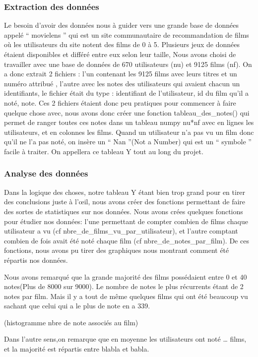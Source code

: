 \documentclass[a4paper,10pt]{article}
\begin{document}
\subsubsection{Extraction des données}
Le besoin d'avoir des données nous à guider vers une grande base de données appelé `` movielens '' qui est un site communautaire de recommandation de films où les utilisateurs du site notent des films de 0 à 5.  
Plusieurs jeux de données étaient disponibles et différé entre eux selon leur taille,  
Nous avons choisi de travailler avec une base de données de 670 utilisateurs (nu) et 9125 films (nf).  
On a donc extrait 2 fichiers : l’un contenant les 9125 films avec leurs titres et un numéro attribué ,  
l’autre avec les notes des utilisateurs qui avaient chacun un identifiants,  
le fichier était du type : identifiant de l’utilisateur, id du film qu’il a noté, note. 
Ces 2 fichiers étaient donc peu pratiques pour commencer à faire quelque chose avec,  
nous avons donc créer une fonction tableau\_des\_notes() qui permet de ranger toutes ces notes dans un tableau numpy nu*nf avec en lignes les utilisateurs,  
et en colonnes les films. Quand un utilisateur n’a pas vu un film donc qu’il ne l’a pas noté,  
on insère un `` Nan ''(Not a Number) qui est un `` symbole '' facile à traiter. On appellera ce tableau Y tout au long du projet. 
\subsubsection{Analyse des données}
Dans la logique des choses, notre tableau Y étant bien trop grand pour en tirer des conclusions 
juste à l’œil, nous avons créer des fonctions permettant de faire des sortes de statistiques sur nos données.
Nous avons crées quelques fonctions pour étudier nos données: l’une permettant de compter combien de films
chaque utilisateur a vu (cf nbre\_de\_films\_vu\_par\_utilisateur), et l’autre comptant combien de fois avait été noté chaque film 
(cf nbre\_de\_notes\_par\_film). De ces fonctions, nous avons pu tirer des graphiques nous montrant comment été répartis nos données.


Nous avons remarqué que la grande majorité des films possédaient entre 0 et 40 notes(Plus de 8000 sur 9000). 
Le nombre de notes le plus récurrents étant de 2 notes par film. Mais il y a tout de même quelques films qui ont été
beaucoup vu sachant que celui qui a le plus de note en a 339.

(histogramme nbre de note associés au film)

Dans l’autre sens,on remarque que en moyenne les utilisateurs ont noté … films, et la majorité est répartis entre blabla et babla.
\end{document}
